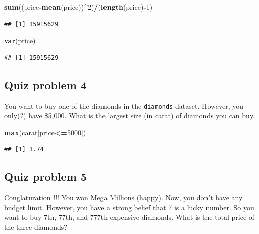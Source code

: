 \documentclass[]{book}
\newenvironment{Shaded}{\begin{snugshade}}{\end{snugshade}}
\newcommand{\DecValTok}[1]{\textcolor[rgb]{0.00,0.00,0.81}{#1}}
\newcommand{\KeywordTok}[1]{\textcolor[rgb]{0.13,0.29,0.53}{\textbf{#1}}}
\newcommand{\NormalTok}[1]{#1}
\newcommand{\OperatorTok}[1]{\textcolor[rgb]{0.81,0.36,0.00}{\textbf{#1}}}
\begin{document}
\begin{Shaded}
\begin{Highlighting}[]
\KeywordTok{sum}\NormalTok{((price}\OperatorTok{-}\KeywordTok{mean}\NormalTok{(price))}\OperatorTok{^}\DecValTok{2}\NormalTok{)}\OperatorTok{/}\NormalTok{(}\KeywordTok{length}\NormalTok{(price)}\OperatorTok{-}\DecValTok{1}\NormalTok{)}
\end{Highlighting}
\end{Shaded}

\begin{verbatim}
## [1] 15915629
\end{verbatim}

\begin{Shaded}
\begin{Highlighting}[]
\KeywordTok{var}\NormalTok{(price)}
\end{Highlighting}
\end{Shaded}

\begin{verbatim}
## [1] 15915629
\end{verbatim}

\hypertarget{quiz-problem-4}{%
\subsection{Quiz problem 4}\label{quiz-problem-4}}

You want to buy one of the diamonds in the \texttt{diamonds} dataset. However, you only(?) have \$5,000. What is the largest size (in carat) of diamonds you can buy.

\begin{Shaded}
\begin{Highlighting}[]
\KeywordTok{max}\NormalTok{(carat[price}\OperatorTok{<=}\DecValTok{5000}\NormalTok{])}
\end{Highlighting}
\end{Shaded}

\begin{verbatim}
## [1] 1.74
\end{verbatim}

\hypertarget{quiz-problem-5}{%
\subsection{Quiz problem 5}\label{quiz-problem-5}}

Conglaturation !!! You won Mega Millions (happy). Now, you don't have any budget limit. However, you have a strong belief that 7 is a lucky number. So you want to buy 7th, 77th, and 777th expensive diamonds. What is the total price of the three diamonds?
\end{document}
